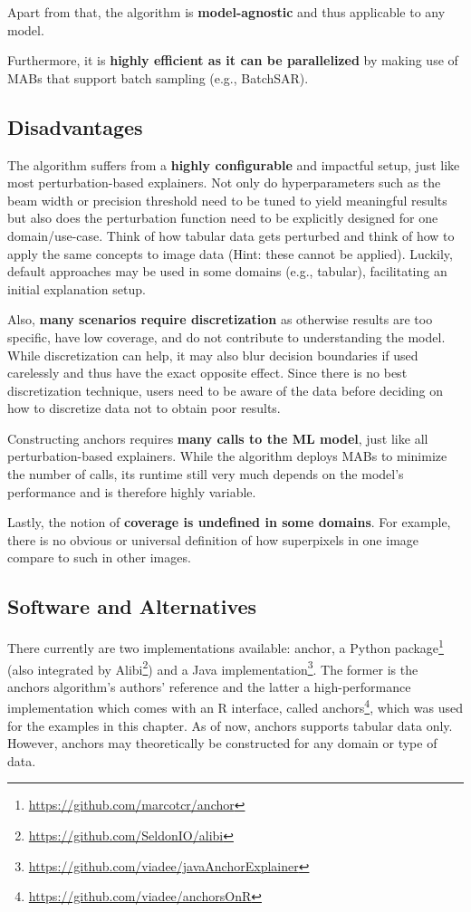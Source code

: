 \documentclass[12pt,]{krantz}
\renewcommand{\href}[2]{#2\footnote{\url{#1}}}
\begin{document}
Apart from that, the algorithm is \textbf{model-agnostic} and thus
applicable to any model.

Furthermore, it is \textbf{highly efficient as it can be parallelized}
by making use of MABs that support batch sampling (e.g., BatchSAR).

\subsection{Disadvantages}\label{disadvantages-15}

The algorithm suffers from a \textbf{highly configurable} and impactful
setup, just like most perturbation-based explainers. Not only do
hyperparameters such as the beam width or precision threshold need to be
tuned to yield meaningful results but also does the perturbation
function need to be explicitly designed for one domain/use-case. Think
of how tabular data gets perturbed and think of how to apply the same
concepts to image data (Hint: these cannot be applied). Luckily, default
approaches may be used in some domains (e.g., tabular), facilitating an
initial explanation setup.

Also, \textbf{many scenarios require discretization} as otherwise
results are too specific, have low coverage, and do not contribute to
understanding the model. While discretization can help, it may also blur
decision boundaries if used carelessly and thus have the exact opposite
effect. Since there is no best discretization technique, users need to
be aware of the data before deciding on how to discretize data not to
obtain poor results.

Constructing anchors requires \textbf{many calls to the ML model}, just
like all perturbation-based explainers. While the algorithm deploys MABs
to minimize the number of calls, its runtime still very much depends on
the model's performance and is therefore highly variable.

Lastly, the notion of \textbf{coverage is undefined in some domains}.
For example, there is no obvious or universal definition of how
superpixels in one image compare to such in other images.

\subsection{Software and
Alternatives}\label{software-and-alternatives-4}

There currently are two implementations available:
\href{https://github.com/marcotcr/anchor}{anchor, a Python package}
(also integrated by \href{https://github.com/SeldonIO/alibi}{Alibi}) and
a \href{https://github.com/viadee/javaAnchorExplainer}{Java
implementation}. The former is the anchors algorithm's authors'
reference and the latter a high-performance implementation which comes
with an R interface, called
\href{https://github.com/viadee/anchorsOnR}{anchors}, which was used for
the examples in this chapter. As of now, anchors supports tabular data
only. However, anchors may theoretically be constructed for any domain
or type of data.
\end{document}
